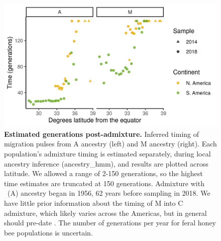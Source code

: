 \begin{figure}[ht]
\includegraphics[width=\textwidth]{chapter1/figures/time_of_admixture_vs_latitude.png}

\caption{ \textbf{Estimated generations post-admixture.} Inferred timing of migration pulses from A ancestry (left) and M ancestry (right). Each population's admixture timing is estimated separately, during local ancestry inference (ancestry\_hmm), and results are plotted across latitude. We allowed a range of 2-150 generations, so the highest time estimates are truncated at 150 generations. Admixture with \scutellata\ (A) ancestry began in 1956, 62 years before sampling in 2018. We have little prior information about the timing of M into C admixture, which likely varies across the Americas, but in general should pre-date . The number of generations per year for feral honey bee populations is uncertain.}
\label{supp_time_admixture}
\end{figure}

